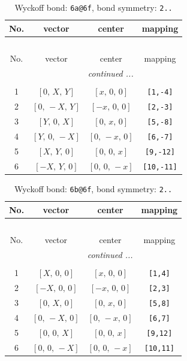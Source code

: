 \documentclass[fleqn,8pt]{jsarticle}
\begin{document}
\begin{longtable}{cccc}
\caption{Wyckoff bond: {\tt 6a@6f}, bond symmetry: {\tt 2..}}
 \\
 \hline \hline
No. & vector & center & mapping \\ \hline \endfirsthead

\multicolumn{3}{l}{\tablename\ \thetable{}} \\
 \hline \hline
No. & vector & center & mapping \\ \hline \endhead

 \hline \hline
\multicolumn{3}{r}{\footnotesize\it continued ...} \\ \endfoot

 \hline \hline
\multicolumn{3}{r}{} \\ \endlastfoot

1 & $\left[ 0,\, X,\, Y \right]$ & $\left[ x,\, 0,\, 0 \right]$ & {\tt [1,-4]} \\ \hline
2 & $\left[ 0,\, - X,\, Y \right]$ & $\left[ - x,\, 0,\, 0 \right]$ & {\tt [2,-3]} \\ \hline
3 & $\left[ Y,\, 0,\, X \right]$ & $\left[ 0,\, x,\, 0 \right]$ & {\tt [5,-8]} \\ \hline
4 & $\left[ Y,\, 0,\, - X \right]$ & $\left[ 0,\, - x,\, 0 \right]$ & {\tt [6,-7]} \\ \hline
5 & $\left[ X,\, Y,\, 0 \right]$ & $\left[ 0,\, 0,\, x \right]$ & {\tt [9,-12]} \\ \hline
6 & $\left[ - X,\, Y,\, 0 \right]$ & $\left[ 0,\, 0,\, - x \right]$ & {\tt [10,-11]} \\
\end{longtable}
\renewcommand{\arraystretch}{1.2}
\begin{longtable}{cccc}
\caption{Wyckoff bond: {\tt 6b@6f}, bond symmetry: {\tt 2..}}
 \\
 \hline \hline
No. & vector & center & mapping \\ \hline \endfirsthead

\multicolumn{3}{l}{\tablename\ \thetable{}} \\
 \hline \hline
No. & vector & center & mapping \\ \hline \endhead

 \hline \hline
\multicolumn{3}{r}{\footnotesize\it continued ...} \\ \endfoot

 \hline \hline
\multicolumn{3}{r}{} \\ \endlastfoot

1 & $\left[ X,\, 0,\, 0 \right]$ & $\left[ x,\, 0,\, 0 \right]$ & {\tt [1,4]} \\ \hline
2 & $\left[ - X,\, 0,\, 0 \right]$ & $\left[ - x,\, 0,\, 0 \right]$ & {\tt [2,3]} \\ \hline
3 & $\left[ 0,\, X,\, 0 \right]$ & $\left[ 0,\, x,\, 0 \right]$ & {\tt [5,8]} \\ \hline
4 & $\left[ 0,\, - X,\, 0 \right]$ & $\left[ 0,\, - x,\, 0 \right]$ & {\tt [6,7]} \\ \hline
5 & $\left[ 0,\, 0,\, X \right]$ & $\left[ 0,\, 0,\, x \right]$ & {\tt [9,12]} \\ \hline
6 & $\left[ 0,\, 0,\, - X \right]$ & $\left[ 0,\, 0,\, - x \right]$ & {\tt [10,11]} \\
\end{longtable}
\end{document}
